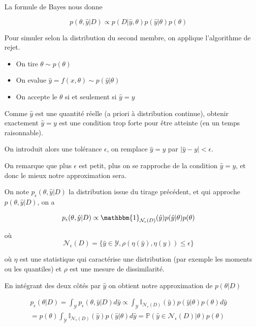 \documentclass[french,12pt]{article}
\begin{document}
La formule de Bayes nous donne

\begin{equation}
    p(\theta, \hat{y} | D) \propto p(D | \hat{y}, \theta) p(\hat{y} | \theta)
    p(\theta) 
\end{equation}

Pour simuler selon la distribution du second membre, on applique
l'algorithme de rejet.

\begin{itemize}
    \item On tire $\theta \sim p(\theta)$
    \item On evalue $\hat{y} = f(x , \theta) \sim p(\hat{y} | \theta)$
    \item On accepte le $\theta$ si et seulement si $\hat{y} = y$
\end{itemize}

Comme $\hat{y}$ est une quantité réelle (a priori à distribution continue),
obtenir exactement $\hat{y} = y$ est une condition trop forte
pour être atteinte (en un temps raisonnable).

On introduit alors une tolérance $\epsilon$, on remplace $\hat{y} = y$
par $|\hat{y} - y| < \epsilon$.

On remarque que plus $\epsilon$ est petit, plus on se rapproche de la condition $\hat{y} = y$,
et donc le mieux notre approximation sera.

On note $p_{\epsilon} (\theta, \hat{y} | D)$ la distribution issue
du tirage précédent, et qui approche $p(\theta, \hat{y} |D)$, on a

\begin{equation}
    p_{\epsilon} (\theta , \hat{y} | D) \propto \mathbbm{1}_{\mathcal{N}_{\epsilon}(D)} (\hat{y}) p(\hat{y} | \theta)
    p(\theta)  
\end{equation}

où 
\begin{equation}
    \mathcal{N}_{\epsilon}(D) = \{\hat{y} \in \mathcal{Y}, \rho(\eta(\hat{y}), \eta(y)) \leq \epsilon\}  
\end{equation}


où $\eta$ est une statistique qui caractérise une distribution
(par exemple les moments ou les quantiles) et $\rho$ est une mesure de dissimilarité.

En intégrant des deux côtés par $\hat{y}$ on obtient notre approximation de $p(\theta | D)$


\begin{align}
    p_{\epsilon}( \theta | D) = \int_{\mathcal{Y}} p_{\epsilon}( \theta , \hat{y}| D) d \hat{y} \propto \int_{\mathcal{Y}} \mathbb{I}_{\mathcal{N}_\epsilon (D)} (\hat{y}) p( \hat{y}| \theta) p( \theta) d \hat{y}  \\
    = p( \theta) \int_{\mathcal{Y}} \mathbb{I}_{\mathcal{N}_\epsilon (D)} (\hat{y})  p( \hat{y}| \theta) d \hat{y} = \mathbb{P} (\hat{y} \in \mathcal{N}_{\epsilon} (D)| \theta) p( \theta) 
\end{align}
\end{document}
